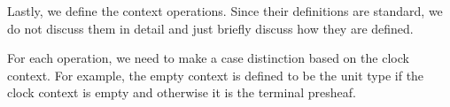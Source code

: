 
Lastly, we define the context operations.
Since their definitions are standard, we do not discuss them in detail and just briefly discuss how they are defined.

For each operation, we need to make a case distinction based on the clock context.
For example, the empty context  is defined to be the unit type if the clock context is empty and otherwise it is the terminal presheaf.

\begin{code}%
\>[0]\AgdaSpace{}%
\AgdaSymbol{:}\AgdaSpace{}%
\AgdaSymbol{(}\AgdaSpace{}%
\AgdaSymbol{:}\AgdaSpace{}%
\AgdaSymbol{)}\AgdaSpace{}%
\AgdaSpace{}%
\AgdaSpace{}%
\<%
\end{code}


